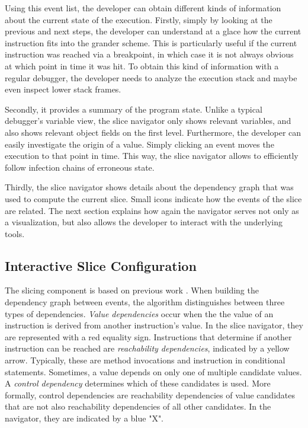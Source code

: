 ﻿\documentclass[
      english,
			conference,
      ]{IEEEtran}
\newcommand{\todo}[2][]{\pdfmargincomment[color=orange,icon=Note,subject={TODO},author={#1}]{#2}}
\begin{document}
Using this event list, the developer can obtain different kinds of information about the current state of the execution.
Firstly, simply by looking at the previous and next steps, the developer can understand at a glace how the current instruction fits into the grander scheme.
This is particularly useful if the current instruction was reached via a breakpoint, in which case it is not always obvious at which point in time it was hit.
To obtain this kind of information with a regular debugger, the developer needs to analyze the execution stack and maybe even inspect lower stack frames.

Secondly, it provides a summary of the program state.
Unlike a typical debugger's variable view, the slice navigator only shows relevant variables, and also shows relevant object fields on the first level.
Furthermore, the developer can easily investigate the origin of a value.
Simply clicking an event moves the execution to that point in time.
This way, the slice navigator allows to efficiently follow infection chains of erroneous state.

Thirdly, the slice navigator shows details about the dependency graph that was used to compute the current slice.
Small icons indicate how the events of the slice are related.
The next section explains how again the navigator serves not only as a visualization, but also allows the developer to interact with the underlying tools.

\subsection{Interactive Slice Configuration}

The slicing component is based on previous work \todo{[xxx]}.
When building the dependency graph between events, the algorithm distinguishes between three types of dependencies.
\emph{Value dependencies} occur when the the value of an instruction is derived from another instruction's value.
In the slice navigator, they are represented with a red equality sign.
Instructions that determine if another instruction can be reached are \emph{reachability dependencies}, indicated by a yellow arrow.
Typically, these are method invocations and instruction in conditional statements.
Sometimes, a value depends on only one of multiple candidate values. 
A \emph{control dependency} determines which of these candidates is used.
More formally, control dependencies are reachability dependencies of value candidates that are not also reachability dependencies of all other candidates.
In the navigator, they are indicated by a blue "X".
\end{document}

